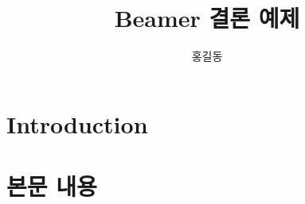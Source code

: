 \documentclass[10pt,compress,slidetop,%
			   hyperref={unicode},xcolor={svgnames},%
			   t]{beamer}
\title %
{Beamer 결론 예제}
\subtitle{}
\author{홍길동 }													%
\institute[] 															%
{자신의 소속 기관}													%
\date[25-03-11] 														%
{}																			%
\begin{document}
%
\begin{frame}
  \titlepage
\end{frame}
%
\section{Introduction}
%
\begin{frame}
	\frametitle{}
	
\end{frame}
%
\begin{frame}
	\frametitle{}
	
\end{frame}
%
\section{본문 내용}
%
\begin{frame}
	\frametitle{}
	
\end{frame}
%
\begin{frame}
	\frametitle{}
	
\end{frame}
%
\begin{frame}
	\frametitle{}
	
\end{frame}
%
\end{document}
